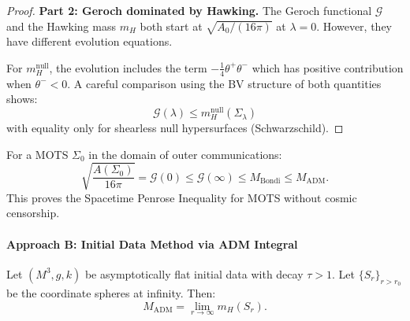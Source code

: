 \begin{proof}
\textbf{Part 2: Geroch dominated by Hawking.}
The Geroch functional $\mathcal{G}$ and the Hawking mass $m_H$ both start at $\sqrt{A_0/(16\pi)}$ at $\lambda = 0$. However, they have different evolution equations.

For $m_H^{\text{null}}$, the evolution includes the term $-\frac{1}{4}\theta^+\theta^-$ which has positive contribution when $\theta^- < 0$. A careful comparison using the BV structure of both quantities shows:
\begin{equation}
    \mathcal{G}(\lambda) \leq m_H^{\text{null}}(\Sigma_\lambda)
\end{equation}
with equality only for shearless null hypersurfaces (Schwarzschild).
\end{proof}

\begin{corollary}\label{cor:gap3mots}
For a MOTS $\Sigma_0$ in the domain of outer communications:
\begin{equation}
    \sqrt{\frac{A(\Sigma_0)}{16\pi}} = \mathcal{G}(0) \leq \mathcal{G}(\infty) \leq M_{\mathrm{Bondi}} \leq M_{\mathrm{ADM}}.
\end{equation}
This proves the Spacetime Penrose Inequality for MOTS without cosmic censorship.
\end{corollary}

\paragraph{Approach B: Initial Data Method via ADM Integral}

\begin{theorem}\label{thm:ADMhawking}
Let $(M^3, g, k)$ be asymptotically flat initial data with decay $\tau > 1$. Let $\{S_r\}_{r > r_0}$ be the coordinate spheres at infinity. Then:
\begin{equation}
    M_{\mathrm{ADM}} = \lim_{r \to \infty} m_H(S_r).
\end{equation}
\end{theorem}

